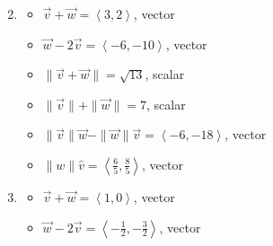 \documentclass{ximera}
\begin{document}
\begin{enumerate}
\begin{multicols}{2}
\begin{itemize}
\end{itemize}

\end{multicols}

\item  

\begin{multicols}{2}

\begin{itemize}

\item  $\vec{v} + \vec{w} = \left<3,2\right> $, vector
\item  $\vec{w}  - 2\vec{v}  = \left<-6, -10 \right>$, vector

\end{itemize}

\end{multicols}

\begin{multicols}{2}

\begin{itemize}

\item $\| \vec{v} + \vec{w} \| = \sqrt{13}$, scalar
\item  $\| \vec{v} \| + \| \vec{w}\| = 7$, scalar

\end{itemize}

\end{multicols}

\begin{multicols}{2}

\begin{itemize}

\item $\| \vec{v} \| \vec{w} - \| \vec{w} \| \vec{v}  = \left<-6,-18\right>$, vector
\item $\|w\| \hat{v}= \left<\frac{6}{5}, \frac{8}{5}\right>$, vector

\end{itemize}

\end{multicols}

\item  

\begin{multicols}{2}

\begin{itemize}

\item  $\vec{v} + \vec{w} = \left<1,0\right> $, vector
\item  $\vec{w}  - 2\vec{v}  = \left<-\frac{1}{2}, -\frac{3}{2} \right>$, vector


\end{itemize}
\end{multicols}
\end{enumerate}
\end{document}
